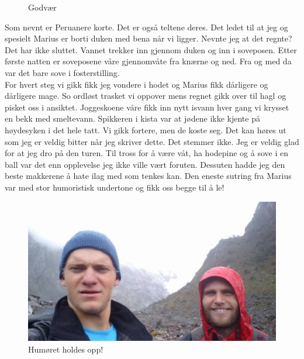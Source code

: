 \begin{figure}[!h]
	\centering
\noindent{}%
	\caption*{Godvær}
\label{fig:godvaer}
\end{figure}

Som nevnt er Peruanere korte. Det er også teltene deres. Det
ledet til at jeg og spesielt Marius er borti duken med bena når vi
ligger. Nevnte jeg at det regnte? Det har ikke sluttet. Vannet trekker
inn gjennom duken og inn i
soveposen. Etter første natten er soveposene våre gjennomvåte fra
knærne og ned. Fra og med da var det bare sove i fosterstilling. \\

For
hvert steg vi gikk fikk jeg vondere i hodet og Marius fikk dårligere og
dårligere mage. So ordløst trasket vi oppover mens regnet gikk over
til hagl og pisket oss i ansiktet. Joggeskoene våre fikk inn nytt
isvann hver gang vi krysset en bekk med smeltevann. Spikkeren i kista
var at jødene ikke kjente på høydesyken i det hele tatt. Vi gikk
fortere, men de koste seg. Det kan høres ut som jeg er veldig bitter
når jeg skriver dette. Det stemmer ikke. Jeg er veldig glad for at jeg
dro på den turen. Til tross for å være våt, ha hodepine og å sove i
en ball var det enn opplevelse jeg ikke ville vært foruten. Dessuten
hadde jeg den beste makkerene å hate ilag med som tenkes kan. Den
eneste sutring fra Marius var med stor
humoristisk undertone og fikk oss begge til å le!
\begin{figure}[!h]
	\centering
	\includegraphics[width=\textwidth]{akselogmariusiregn2}
	\caption*{Humøret holdes opp!}
\label{fig:turiregnet}
\end{figure}
